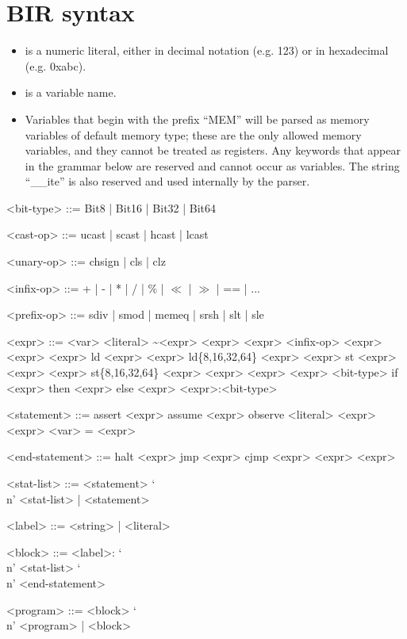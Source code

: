 \documentclass{article}
\begin{document}
\section{BIR syntax}

\begin{itemize}
\item {} is a numeric literal, either in decimal notation (e.g. 123)
or in hexadecimal (e.g. 0xabc).

\item {} is a variable name.

\item Variables that begin with the prefix ``MEM'' will be parsed as memory
  variables of default memory type; these are the only allowed memory variables,
  and they cannot be treated as registers. Any keywords that appear in the
  grammar below are reserved and cannot occur as variables. The string ``__ite''
  is also reserved and used internally by the parser.
\end{itemize}

\setlength{\grammarparsep}{4pt plus 1pt minus 1pt} %
\setlength{\grammarindent}{12em} %

\begin{grammar}

  <bit-type> ::= Bit8 | Bit16 | Bit32 | Bit64

  <cast-op> ::= ucast | scast | hcast | lcast

  <unary-op> ::= chsign | cls | clz

  <infix-op> ::= + | - | * | / | \% | $\ll$ | $\gg$ | == | ...

  <prefix-op> ::= sdiv | smod | memeq | srsh | slt | sle

  <expr> ::= <var> \alt <literal>
  \alt \textasciitilde <expr>
   <expr>
  \alt <expr> <infix-op> <expr>
   <expr> <expr>
  \alt ld <expr> <expr>
  \alt ld\{8,16,32,64\} <expr> <expr>
  \alt st <expr> <expr> <expr>
  \alt st\{8,16,32,64\} <expr> <expr> <expr>
   <expr> <bit-type>
  \alt if <expr> then <expr> else <expr>
  \alt <expr>:<bit-type>

  <statement> ::= assert <expr>
  \alt assume <expr>
  \alt observe <literal> <expr> <expr>
  \alt <var> = <expr>

  <end-statement> ::= halt <expr>
  \alt jmp <expr>
  \alt cjmp <expr> <expr> <expr>

  <stat-list> ::= <statement> `\\n' <stat-list> | <statement> 

  <label> ::= <string> | <literal>

  <block> ::= <label>: `\\n' <stat-list> `\\n' <end-statement>

  <program> ::= <block> `\\n' <program> | <block>
\end{grammar}
\end{document}
